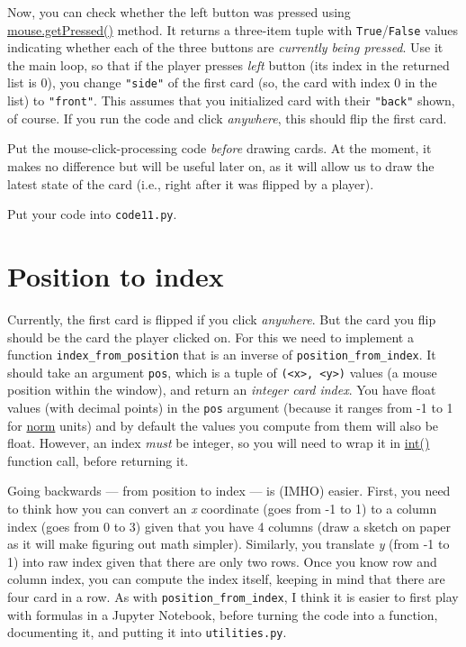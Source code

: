 \documentclass[
]{book}
\begin{document}
Now, you can check whether the left button was pressed using \href{https://psychopy.org/api/event.html\#psychopy.event.Mouse.getPressed}{mouse.getPressed()} method. It returns a three-item tuple with \texttt{True}/\texttt{False} values indicating whether each of the three buttons are \emph{currently being pressed}. Use it the main loop, so that if the player presses \emph{left} button (its index in the returned list is 0), you change \texttt{"side"} of the first card (so, the card with index 0 in the list) to \texttt{"front"}. This assumes that you initialized card with their \texttt{"back"} shown, of course. If you run the code and click \emph{anywhere}, this should flip the first card.

Put the mouse-click-processing code \emph{before} drawing cards. At the moment, it makes no difference but will be useful later on, as it will allow us to draw the latest state of the card (i.e., right after it was flipped by a player).

Put your code into \texttt{code11.py}.

\hypertarget{position-to-index}{%
\section{Position to index}\label{position-to-index}}

Currently, the first card is flipped if you click \emph{anywhere}. But the card you flip should be the card the player clicked on. For this we need to implement a function \texttt{index\_from\_position} that is an inverse of \texttt{position\_from\_index}. It should take an argument \texttt{pos}, which is a tuple of \texttt{(\textless{}x\textgreater{},\ \textless{}y\textgreater{})} values (a mouse position within the window), and return an \emph{integer card index}. You have float values (with decimal points) in the \texttt{pos} argument (because it ranges from -1 to 1 for \protect\hyperlink{psychopy-units-norm}{norm} units) and by default the values you compute from them will also be float. However, an index \emph{must} be integer, so you will need to wrap it in \href{https://docs.python.org/3/library/functions.html\#int}{int()} function call, before returning it.

Going backwards --- from position to index --- is (IMHO) easier. First, you need to think how you can convert an \emph{x} coordinate (goes from -1 to 1) to a column index (goes from 0 to 3) given that you have 4 columns (draw a sketch on paper as it will make figuring out math simpler). Similarly, you translate \emph{y} (from -1 to 1) into raw index given that there are only two rows. Once you know row and column index, you can compute the index itself, keeping in mind that there are four card in a row. As with \texttt{position\_from\_index}, I think it is easier to first play with formulas in a Jupyter Notebook, before turning the code into a function, documenting it, and putting it into \texttt{utilities.py}.
\end{document}
